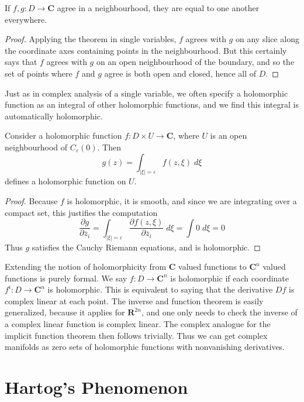 \begin{theorem}
    If $f,g: D \to \mathbf{C}$ agree in a neighbourhood, they are equal to one another everywhere.
\end{theorem}
\begin{proof}
    Applying the theorem in single variables, $f$ agrees with $g$ on any slice along the coordinate axes containing points in the neighbourhood. But this certainly says that $f$ agrees with $g$ on an open neighbourhood of the boundary, and so the set of points where $f$ and $g$ agree is both open and closed, hence all of $D$.
\end{proof}

Just as in complex analysis of a single variable, we often specify a holomorphic function as an integral of other holomorphic functions, and we find this integral is automatically holomorphic.

\begin{lemma}
    Consider a holomorphic function $f: D \times U \to \mathbf{C}$, where $U$ is an open neighbourhood of $C_\varepsilon(0)$. Then
    \[ g(z) = \int_{|\xi| = \varepsilon} f(z,\xi)\; d\xi \]
    defines a holomorphic function on $U$.
\end{lemma}
\begin{proof}
    Because $f$ is holomorphic, it is smooth, and since we are integrating over a compact set, this justifies the computation
    \[ \frac{\partial g}{\partial \overline{z}_i} = \int_{|\xi| = \varepsilon} \frac{\partial f(z,\xi)}{\partial \overline{z}_i}\; d\xi = \int 0\; d\xi = 0 \]
    Thus $g$ satisfies the Cauchy Riemann equations, and is holomorphic.
\end{proof}

Extending the notion of holomorphicity from $\mathbf{C}$ valued functions to $\mathbf{C}^n$ valued functions is purely formal. We say $f: D \to \mathbf{C}^n$ is holomorphic if each coordinate $f^i: D \to \mathbf{C}^n$ is holomorphic. This is equivalent to saying that the derivative $Df$ is complex linear at each point. The inverse and function theorem is easily generalized, because it applies for $\mathbf{R}^{2n}$, and one only needs to check the inverse of a complex linear function is complex linear. The complex analogue for the implicit function theorem then follows trivially. Thus we can get complex manifolds as zero sets of holomorphic functions with nonvanishing derivatives.

\section{Hartog's Phenomenon}

